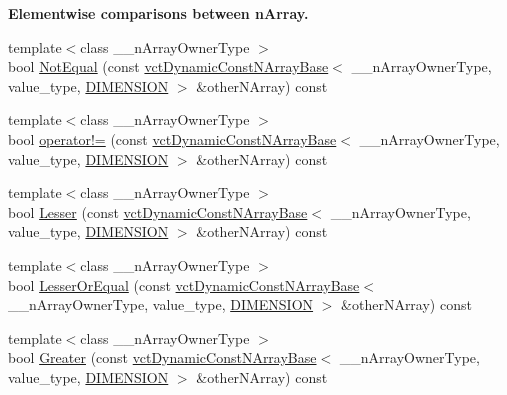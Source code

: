 \begin{Indent}{\bf Elementwise comparisons between n\-Array.}
\begin{DoxyCompactItemize}
{\footnotesize template$<$class \-\_\-\-\_\-n\-Array\-Owner\-Type $>$ }\\bool \hyperlink{classvct_dynamic_const_n_array_base_acbfcf853b7958a88a801fec6e5596074}{Not\-Equal} (const \hyperlink{classvct_dynamic_const_n_array_base}{vct\-Dynamic\-Const\-N\-Array\-Base}$<$ \-\_\-\-\_\-n\-Array\-Owner\-Type, value\-\_\-type, \hyperlink{classvct_dynamic_const_n_array_base_a815ac316ebc1bb2ab1969d307549826faf759c9ab831ff929b89af4ea2865a378}{D\-I\-M\-E\-N\-S\-I\-O\-N} $>$ \&other\-N\-Array) const 
\item 
{\footnotesize template$<$class \-\_\-\-\_\-n\-Array\-Owner\-Type $>$ }\\bool \hyperlink{classvct_dynamic_const_n_array_base_a0ed74e43fb1fd1fd3d018d354be08c4c}{operator!=} (const \hyperlink{classvct_dynamic_const_n_array_base}{vct\-Dynamic\-Const\-N\-Array\-Base}$<$ \-\_\-\-\_\-n\-Array\-Owner\-Type, value\-\_\-type, \hyperlink{classvct_dynamic_const_n_array_base_a815ac316ebc1bb2ab1969d307549826faf759c9ab831ff929b89af4ea2865a378}{D\-I\-M\-E\-N\-S\-I\-O\-N} $>$ \&other\-N\-Array) const 
\item 
{\footnotesize template$<$class \-\_\-\-\_\-n\-Array\-Owner\-Type $>$ }\\bool \hyperlink{classvct_dynamic_const_n_array_base_a699304a68d5f14a37ee307ff880a7769}{Lesser} (const \hyperlink{classvct_dynamic_const_n_array_base}{vct\-Dynamic\-Const\-N\-Array\-Base}$<$ \-\_\-\-\_\-n\-Array\-Owner\-Type, value\-\_\-type, \hyperlink{classvct_dynamic_const_n_array_base_a815ac316ebc1bb2ab1969d307549826faf759c9ab831ff929b89af4ea2865a378}{D\-I\-M\-E\-N\-S\-I\-O\-N} $>$ \&other\-N\-Array) const 
\item 
{\footnotesize template$<$class \-\_\-\-\_\-n\-Array\-Owner\-Type $>$ }\\bool \hyperlink{classvct_dynamic_const_n_array_base_a7129dce6546d6ff7bced8637c43513df}{Lesser\-Or\-Equal} (const \hyperlink{classvct_dynamic_const_n_array_base}{vct\-Dynamic\-Const\-N\-Array\-Base}$<$ \-\_\-\-\_\-n\-Array\-Owner\-Type, value\-\_\-type, \hyperlink{classvct_dynamic_const_n_array_base_a815ac316ebc1bb2ab1969d307549826faf759c9ab831ff929b89af4ea2865a378}{D\-I\-M\-E\-N\-S\-I\-O\-N} $>$ \&other\-N\-Array) const 
\item 
{\footnotesize template$<$class \-\_\-\-\_\-n\-Array\-Owner\-Type $>$ }\\bool \hyperlink{classvct_dynamic_const_n_array_base_aba767cde89524f3df3fed74bfce09657}{Greater} (const \hyperlink{classvct_dynamic_const_n_array_base}{vct\-Dynamic\-Const\-N\-Array\-Base}$<$ \-\_\-\-\_\-n\-Array\-Owner\-Type, value\-\_\-type, \hyperlink{classvct_dynamic_const_n_array_base_a815ac316ebc1bb2ab1969d307549826faf759c9ab831ff929b89af4ea2865a378}{D\-I\-M\-E\-N\-S\-I\-O\-N} $>$ \&other\-N\-Array) const 

\end{DoxyCompactItemize}
\end{Indent}
